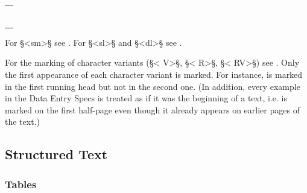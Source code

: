 \documentclass[fontsize=11pt, paper=a4, 
DIV15,
headings=normal,
parskip=half-, 
numbers=noenddot]{scrartcl}
\makeatletter
\newenvironment{typeChinese}{\begin{alltt}\s\begin{tabular}{@{}l}}{\end{tabular}\end{alltt}}
\newcommand{\chin}[1]{{\fontspec{Sun-ExtA}{#1}}}
\newcommand{\sunExtA}[1]{{\fontspec{Sun-ExtA}{#1}}}
\newcommand{\f}[1]{\bold{#1}} %
\newcommand{\z}[1]{\chin{#1}} %
\makeatother
\begin{document}
\begin{typeChinese}
\z{敏捷}\f{<}\z{伶}\f{V>}\z{俐之外人。來求面會}\f{<sl>}\z{司}\f{</sl>}\z{氏。}\f{<sl>}\z{司民頓}\f{</sl>}\z{爲人温厚不設城壁。應來客之} \\
\z{扣。而說明其機關之詳細。不圖此外人卽夫}\f{<sl>}\z{耳頓}\f{</sl>}\z{也。夫耳頓得盡叩其端} \\
\z{委。乃藉之以爲自己發明之端}\f{<}\z{緖}\f{R>}\z{云。此事未知果否。}\f{</p>} \\
\f{<h 2>}\z{船}\f{</h>} \\
\f{<p>}\z{創世紀云『諾亞當洪水時以松木爲方舟』。其方舟長三百喬別}\f{<sm>}\z{每喬別}\f{<}\z{約}\f{V>}\z{長}\f{\bs\bs}\z{十八英寸}\f{<sm>}\z{　}\f{<}\z{廣}\f{V>} \\
\z{五十喬別。高三十喬別。中造房。以瀝靑塗其內外。及有導光牖。又方舟分爲三層。} \\
\z{曰下牀二樓。三樓。此乃船之最古者也。但獨木船則彼石器時代之人。亦}\sunExtA{既}\z{能造} \\
\end{typeChinese}

\begin{crossref}
For §<sm>§ see . For §<sl>§ and §<dl>§ see .
\end{crossref}

\vspace{3mm}
\begin{note}
For the marking of character variants (§< V>§, §< R>§, §< RV>§) see . Only the first appearance of each character variant is marked. For instance, \z{起} is marked in the first running head but not in the second one. 
(In addition, every example in the Data Entry Specs is treated as if it was the beginning of a text, i.e. \z{起} is marked on the first half-page even though it already appears on earlier pages of the text.)
\end{note}


\tocspace
\subsection{Structured Text}
\label{section structured text}

\subsubsection{Tables}
\label{section tables}
\end{document}
